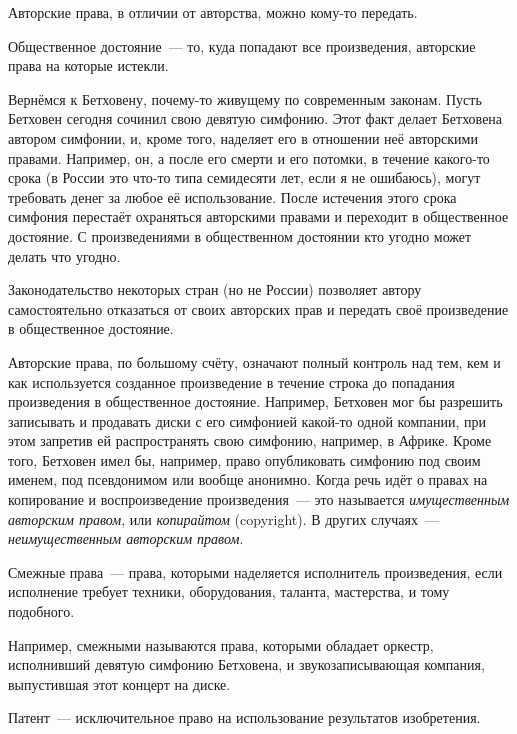 Авторские права, в отличии от авторства, можно кому-то передать.

\begin{definition}
Общественное достояние~--- то, куда попадают все произведения, авторские права на которые истекли.
\end{definition}

Вернёмся к Бетховену, почему-то живущему по современным законам.
Пусть Бетховен сегодня сочинил свою девятую симфонию.
Этот факт делает Бетховена автором симфонии, и, кроме того, наделяет его в отношении неё авторскими правами.
Например, он, а после его смерти и его потомки, в течение какого-то срока (в России это что-то типа семидесяти лет, если я не ошибаюсь), могут требовать денег за любое её использование.
После истечения этого срока симфония перестаёт охраняться авторскими правами и переходит в общественное достояние.
С произведениями в общественном достоянии кто угодно может делать что угодно.

Законодательство некоторых стран (но не России) позволяет автору самостоятельно отказаться от своих авторских прав и передать своё произведение в общественное достояние.

Авторские права, по большому счёту, означают полный контроль над тем, кем и как используется созданное произведение в течение строка до попадания произведения в общественное достояние.
Например, Бетховен мог бы разрешить записывать и продавать диски с его симфонией какой-то одной компании, при этом запретив ей распространять свою симфонию, например, в Африке.
Кроме того, Бетховен имел бы, например, право опубликовать симфонию под своим именем, под псевдонимом или вообще анонимно.
Когда речь идёт о правах на копирование и воспроизведение произведения~--- это называется \emph{имущественным авторским правом}, или \emph{копирайтом} (copyright). В других случаях~--- \emph{неимущественным авторским правом}.

\begin{definition}
Смежные права~--- права, которыми наделяется исполнитель произведения, если исполнение требует техники, оборудования, таланта, мастерства, и тому подобного.
\end{definition}

Например, смежными называются права, которыми обладает оркестр, исполнивший девятую симфонию Бетховена, и звукозаписывающая компания, выпустившая этот концерт на диске.

\begin{definition}
Патент~--- исключительное право на использование результатов изобретения.
\end{definition}

